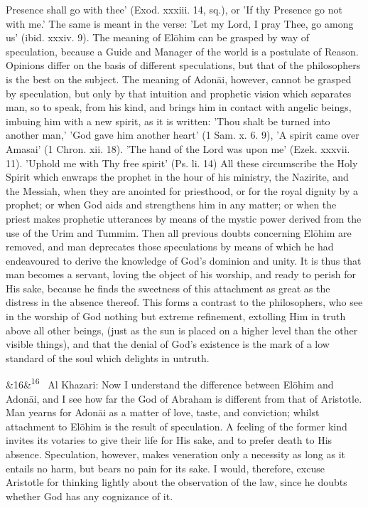\documentclass[12pt]{article}
\newcommand{\para}[1][]{\par\noindent\ifx&#1&\else\textsuperscript{\footnotesize #1}~\fi}
\begin{document}
Presence shall go with thee' (Exod. xxxiii. 14, sq.), or 'If thy Presence go not with me.' The same is meant in the verse: 'Let my Lord, I pray Thee, go among us' (ibid. xxxiv. 9). The meaning of Elōhim can be grasped by way of speculation, because a Guide and Manager of the world is a postulate of Reason. Opinions differ on the basis of different speculations, but that of the philosophers is the best on the subject. The meaning of Adonāi, however, cannot be grasped by speculation, but only by that intuition and prophetic vision which separates man, so to speak, from his kind, and brings him in contact with angelic beings, imbuing him with a new spirit, as it is written: 'Thou shalt be turned into another man,' 'God gave him another heart' (1 Sam. x. 6. 9), 'A spirit came over Amasai' (1 Chron. xii. 18). 'The hand of the Lord was upon me' (Ezek. xxxvii. 11). 'Uphold me with Thy free spirit' (Ps. li. 14) All these circumscribe the Holy Spirit which enwraps the prophet in the hour of his ministry, the Nazirite, and the Messiah, when they are anointed for priesthood, or for the royal dignity by a prophet; or when God aids and strengthens him in any matter; or when the priest makes prophetic utterances by means of the mystic power derived from the use of the Urim and Tummim. Then all previous doubts concerning Elōhim are removed, and man deprecates those speculations by means of which he had endeavoured to derive the knowledge of God's dominion and unity. It is thus that man becomes a servant, loving the object of his worship, and ready to perish for His sake, because he finds the sweetness of this attachment as great as the distress in the absence thereof. This forms a contrast to the philosophers, who see in the worship of God nothing but extreme refinement, extolling Him in truth above all other beings, (just as the sun is placed on a higher level than the other visible things), and that the denial of God's existence is the mark of a low standard of the soul which delights in untruth.

\para[16] Al Khazari: Now I understand the difference between Elōhim and Adonāi, and I see how far the God of Abraham is different from that of Aristotle. Man yearns for Adonāi as a matter of love, taste, and conviction; whilst attachment to Elōhim is the result of speculation. A feeling of the former kind invites its votaries to give their life for His sake, and to prefer death to His absence. Speculation, however, makes veneration only a necessity as long as it entails no harm, but bears no pain for its sake. I would, therefore, excuse Aristotle for thinking lightly about the observation of the law, since he doubts whether God has any cognizance of it.
\end{document}
